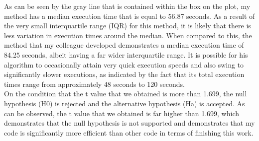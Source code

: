 \par
As can be seen by the gray line that is contained within the box on the plot, 
my method has a median execution time that is equal to 56.87 seconds. 
As a result of the very small interquartile range (IQR) for this method, 
it is likely that there is less variation in execution times around the median.
When compared to this, the method that my colleague developed demonstrates 
a median execution time of 84.25 seconds, albeit having a far wider interquartile range. 
It is possible for his algorithm to occasionally attain very quick execution speeds and 
also swing to significantly slower executions, as indicated by the fact that its 
total execution times range from approximately 48 seconds to 120 seconds.
\\
On the condition that the t value that we obtained is more than 1.699, 
the null hypothesis (H0) is rejected and the alternative hypothesis (Ha) is accepted. 
As can be observed, the t value that we obtained is far higher than 1.699, 
which demonstrates that the null hypothesis is not supported and demonstrates 
that my code is significantly more efficient than other code in terms of finishing this work.





  




\newpage